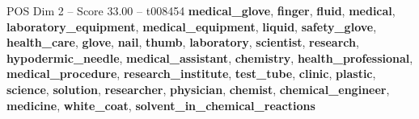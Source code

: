 \begin{textsample}{POS Dim 2 – Score 33.00 – t008454}  \label{ex:f2_pos_002}
\textbf{medical\_glove}, \textbf{finger}, \textbf{fluid}, \textbf{medical}, \textbf{laboratory\_equipment}, \textbf{medical\_equipment}, \textbf{liquid}, \textbf{safety\_glove}, \textbf{health\_care}, \textbf{glove}, \textbf{nail}, \textbf{thumb}, \textbf{laboratory}, \textbf{scientist}, \textbf{research}, \textbf{hypodermic\_needle}, \textbf{medical\_assistant}, \textbf{chemistry}, \textbf{health\_professional}, \textbf{medical\_procedure}, \textbf{research\_institute}, \textbf{test\_tube}, \textbf{clinic}, \textbf{plastic}, \textbf{science}, \textbf{solution}, \textbf{researcher}, \textbf{physician}, \textbf{chemist}, \textbf{chemical\_engineer}, \textbf{medicine}, \textbf{white\_coat}, \textbf{solvent\_in\_chemical\_reactions}

\end{textsample}
